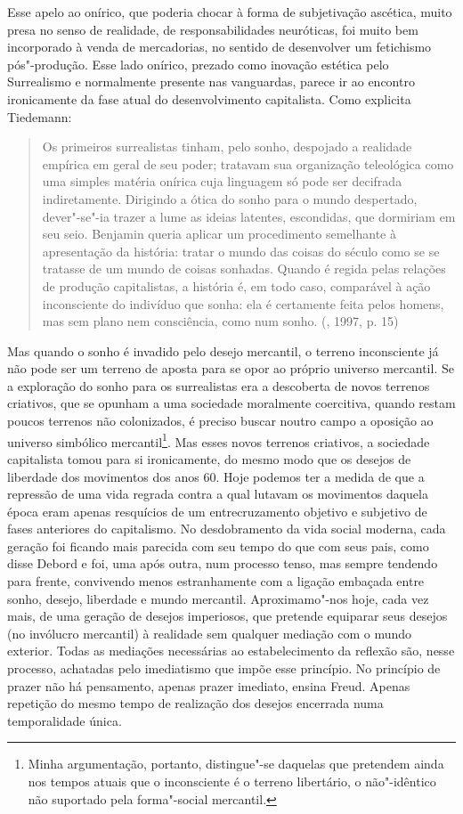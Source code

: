 Esse apelo ao onírico, que poderia chocar à forma de subjetivação
ascética, muito presa no senso de realidade, de responsabilidades
neuróticas, foi muito bem incorporado à venda de mercadorias, no sentido
de desenvolver um fetichismo pós"-produção. Esse lado onírico, prezado
como inovação estética pelo Surrealismo e normalmente presente nas
vanguardas, parece ir ao encontro ironicamente da fase atual do
desenvolvimento capitalista. Como explicita Tiedemann:

\begin{quote}
Os primeiros surrealistas tinham, pelo sonho, despojado a realidade
empírica em geral de seu poder; tratavam sua organização teleológica
como uma simples matéria onírica cuja linguagem só pode ser decifrada
indiretamente. Dirigindo a ótica do sonho para o mundo despertado,
dever"-se"-ia trazer a lume as ideias latentes, escondidas, que dormiriam
em seu seio. Benjamin queria aplicar um procedimento semelhante à
apresentação da história: tratar o mundo das coisas do século  como
se se tratasse de um mundo de coisas sonhadas. Quando é regida pelas
relações de produção capitalistas, a história é, em todo caso,
comparável à ação inconsciente do indivíduo que sonha: ela é certamente
feita pelos homens, mas sem plano nem consciência, como num sonho.
(, 1997, p. 15)
\end{quote}

Mas quando o sonho é invadido pelo desejo mercantil, o terreno
inconsciente já não pode ser um terreno de aposta para se opor ao
próprio universo mercantil. Se a exploração do sonho para os
surrealistas era a descoberta de novos terrenos criativos, que se
opunham a uma sociedade moralmente coercitiva, quando restam poucos
terrenos não colonizados, é preciso buscar noutro campo a oposição ao
universo simbólico mercantil\footnote{Minha argumentação, portanto,
  distingue"-se daquelas que pretendem ainda nos tempos atuais que o
  inconsciente é o terreno libertário, o não"-idêntico não suportado pela
  forma"-social mercantil.}. Mas esses novos terrenos criativos, a
sociedade capitalista tomou para si ironicamente, do mesmo modo que os
desejos de liberdade dos movimentos dos anos 60. Hoje podemos ter a
medida de que a repressão de uma vida regrada contra a qual lutavam os
movimentos daquela época eram apenas resquícios de um entrecruzamento
objetivo e subjetivo de fases anteriores do capitalismo. No
desdobramento da vida social moderna, cada geração foi ficando mais
parecida com seu tempo do que com seus pais, como disse Debord e
foi, uma após outra, num processo tenso, mas sempre tendendo para
frente, convivendo menos estranhamente com a ligação embaçada entre
sonho, desejo, liberdade e mundo mercantil. Aproximamo"-nos hoje, cada
vez mais, de uma geração de desejos imperiosos, que pretende equiparar
seus desejos (no invólucro mercantil) à realidade sem qualquer mediação
com o mundo exterior. Todas as mediações necessárias ao estabelecimento
da reflexão são, nesse processo, achatadas pelo imediatismo que impõe
esse princípio. No princípio de prazer não há pensamento, apenas prazer
imediato, ensina Freud. Apenas repetição do mesmo tempo de realização
dos desejos encerrada numa temporalidade única.

